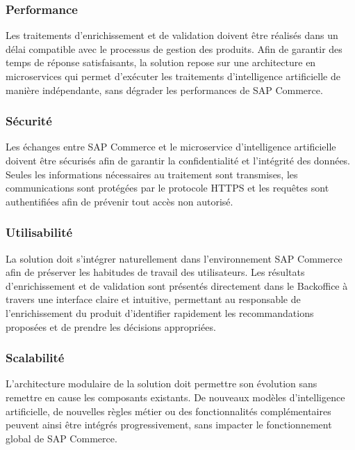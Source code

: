 \subsubsection{Performance}

Les traitements d'enrichissement et de validation doivent être réalisés dans un délai compatible avec le processus de gestion des produits. Afin de garantir des temps de réponse satisfaisants, la solution repose sur une architecture en microservices qui permet d'exécuter les traitements d'intelligence artificielle de manière indépendante, sans dégrader les performances de SAP Commerce.

\subsubsection{Sécurité}

Les échanges entre SAP Commerce et le microservice d'intelligence artificielle doivent être sécurisés afin de garantir la confidentialité et l'intégrité des données. Seules les informations nécessaires au traitement sont transmises, les communications sont protégées par le protocole HTTPS  et les requêtes sont authentifiées afin de prévenir tout accès non autorisé.

\subsubsection{Utilisabilité}

La solution doit s'intégrer naturellement dans l'environnement SAP Commerce afin de préserver les habitudes de travail des utilisateurs. Les résultats d'enrichissement et de validation sont présentés directement dans le Backoffice à travers une interface claire et intuitive, permettant au responsable de l'enrichissement du produit d'identifier rapidement les recommandations proposées et de prendre les décisions appropriées.

\subsubsection{Scalabilité}

L'architecture modulaire de la solution doit permettre son évolution sans remettre en cause les composants existants. De nouveaux modèles d'intelligence artificielle, de nouvelles règles métier ou des fonctionnalités complémentaires peuvent ainsi être intégrés progressivement, sans impacter le fonctionnement global de SAP Commerce.


